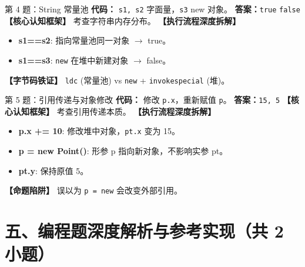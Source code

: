 ﻿\documentclass[12pt, a4paper]{ctexart}
\begin{document}
\begin{bluebox}{第 4 题：String 常量池}
	\textbf{代码：} \texttt{s1, s2} 字面量，\texttt{s3} new 对象。
	\textbf{答案：}\texttt{true} \newline \texttt{false}
	\textbf{【核心认知框架】} 考查字符串内存分布。
	\textbf{【执行流程深度拆解】}
	\begin{itemize}[leftmargin=*, nosep]
		\item \textbf{s1==s2}: 指向常量池同一对象 $\rightarrow$ true。
		\item \textbf{s1==s3}: \texttt{new} 在堆中新建对象 $\rightarrow$ false。
	\end{itemize}
	\textbf{【字节码铁证】} \texttt{ldc} (常量池) vs \texttt{new} + \texttt{invokespecial} (堆)。
\end{bluebox}

\begin{bluebox}{第 5 题：引用传递与对象修改}
	\textbf{代码：} 修改 \texttt{p.x}，重新赋值 \texttt{p}。
	\textbf{答案：}\texttt{15, 5}
	\textbf{【核心认知框架】} 考查引用传递本质。
	\textbf{【执行流程深度拆解】}
	\begin{itemize}[leftmargin=*, nosep]
		\item \textbf{p.x += 10}: 修改堆中对象，\texttt{pt.x} 变为 15。
		\item \textbf{p = new Point()}: 形参 p 指向新对象，不影响实参 pt。
		\item \textbf{pt.y}: 保持原值 5。
	\end{itemize}
	\textbf{【命题陷阱】} 误以为 \texttt{p = new} 会改变外部引用。
\end{bluebox}

\section{五、编程题深度解析与参考实现（共 2 小题）}
\end{document}
